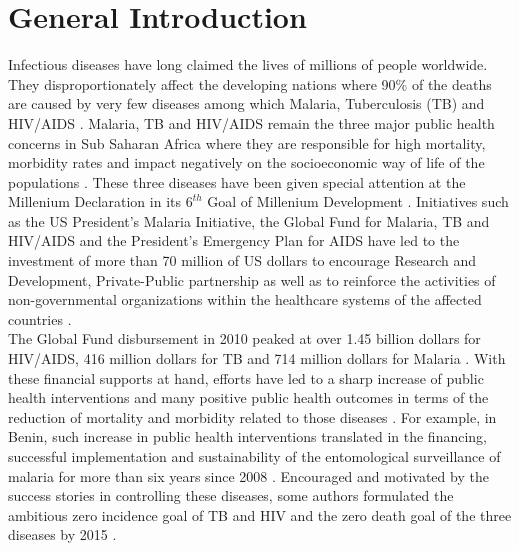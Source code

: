 
\clearpage  %
\chapter*{\centering General Introduction}
Infectious diseases have long claimed the lives of millions of people worldwide. They disproportionately affect the developing nations where 90\% of the deaths are caused by very few diseases among which Malaria, Tuberculosis (TB) and HIV/AIDS \cite{davis_emerging_2001}. Malaria, TB and HIV/AIDS remain the three major public health concerns in Sub Saharan Africa where they are responsible for high mortality, morbidity rates and impact negatively on the socioeconomic way of life of the populations \cite{gallup_economic_2001,vitoria_global_2009}. These three diseases have been given special attention at the Millenium Declaration in its $6^{th}$ Goal of Millenium Development \cite{assembly_united_2000}. Initiatives such as the US President’s Malaria Initiative, the Global Fund for Malaria, TB and HIV/AIDS and the President’s Emergency Plan for AIDS have led to the investment of more than 70 million of US dollars to encourage Research and Development, Private-Public partnership as well as to reinforce the activities of non-governmental organizations within the healthcare systems of the affected countries \cite{arthur_institute_2014,murray_global_2014,stoops_presidents_2008}.\\
The Global Fund disbursement in 2010 peaked at over 1.45 billion dollars for HIV/AIDS, 416 million dollars for TB and 714 million dollars for Malaria \cite{global_fund_making_2011,world_health_organization_world_2012}. With these financial supports at hand, efforts have led to a sharp increase of public health interventions and many positive public health outcomes in terms of the reduction of mortality and morbidity related to those diseases \cite{barat_four_2006}. For example, in Benin, such increase in public health interventions translated in the financing, successful implementation and sustainability of the entomological surveillance of malaria for more than six years since 2008 \cite{akogbeto_six_2015}.  Encouraged and motivated by the success stories in controlling these diseases, some authors formulated the ambitious zero incidence goal of TB and HIV and the zero death goal of the three diseases by 2015 \cite{joint_united_nations_programme_on_hiv/aids_getting_2010}. \\
